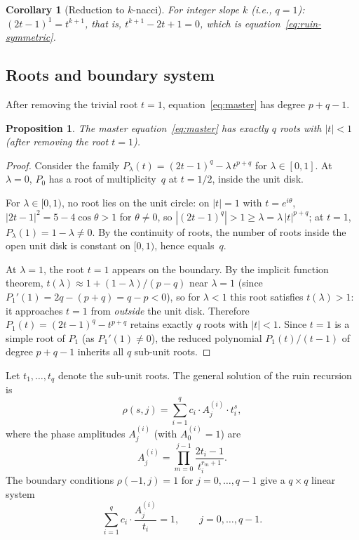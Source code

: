 \documentclass[11pt]{article}
\newtheorem{corollary}[theorem]{Corollary}
\newtheorem{proposition}[theorem]{Proposition}
\theoremstyle{definition}
\theoremstyle{remark}
\begin{document}
\begin{corollary}[Reduction to $k$-nacci]\label{cor:integer-collapse}
For integer slope $k$ (i.e., $q = 1$): $(2t-1)^1 = t^{k+1}$,
that is, $t^{k+1} - 2t + 1 = 0$, which is
equation~\eqref{eq:ruin-symmetric}.
\end{corollary}

\subsection{Roots and boundary system}

After removing the trivial root $t = 1$, equation~\eqref{eq:master}
has degree $p + q - 1$.

\begin{proposition}\label{prop:q-roots}
The master equation~\eqref{eq:master} has exactly $q$ roots
with $|t| < 1$ (after removing the root $t = 1$).
\end{proposition}

\begin{proof}
Consider the family $P_\lambda(t) = (2t-1)^q - \lambda\, t^{p+q}$
for $\lambda \in [0, 1]$.
At $\lambda = 0$, $P_0$ has a root of multiplicity~$q$ at $t = 1/2$,
inside the unit disk.

For $\lambda \in [0, 1)$, no root lies on the unit circle:
on $|t| = 1$ with $t = e^{i\theta}$,
$|2t - 1|^2 = 5 - 4\cos\theta > 1$ for $\theta \neq 0$,
so $|(2t-1)^q| > 1 \geq \lambda = \lambda\,|t|^{p+q}$;
at $t = 1$, $P_\lambda(1) = 1 - \lambda \neq 0$.
By the continuity of roots, the number of roots
inside the open unit disk is constant on $[0, 1)$, hence equals~$q$.

At $\lambda = 1$, the root $t = 1$ appears on the boundary.
By the implicit function theorem,
$t(\lambda) \approx 1 + (1-\lambda)/(p-q)$
near $\lambda = 1$ (since $P_1'(1) = 2q - (p+q) = q - p < 0$),
so for $\lambda < 1$ this root satisfies $t(\lambda) > 1$:
it approaches $t = 1$ from \emph{outside} the unit disk.
Therefore $P_1(t) = (2t-1)^q - t^{p+q}$ retains exactly $q$ roots
with $|t| < 1$.
Since $t = 1$ is a simple root of $P_1$ (as $P_1'(1) \neq 0$),
the reduced polynomial $P_1(t)/(t-1)$ of degree $p + q - 1$
inherits all $q$ sub-unit roots.
\end{proof}

Let $t_1, \ldots, t_q$ denote the sub-unit roots.
The general solution of the ruin recursion is
\[
\rho(s, j) = \sum_{i=1}^{q} c_i \cdot A_j^{(i)} \cdot t_i^s,
\]
where the phase amplitudes $A_j^{(i)}$ (with $A_0^{(i)} = 1$) are
\begin{equation}\label{eq:amplitudes}
A_j^{(i)} = \prod_{m=0}^{j-1} \frac{2t_i - 1}{t_i^{r_m + 1}}.
\end{equation}
The boundary conditions $\rho(-1, j) = 1$ for $j = 0, \ldots, q - 1$
give a $q \times q$ linear system
\begin{equation}\label{eq:boundary}
\sum_{i=1}^{q} c_i \cdot \frac{A_j^{(i)}}{t_i} = 1,
\qquad j = 0, \ldots, q - 1.
\end{equation}
\end{document}
